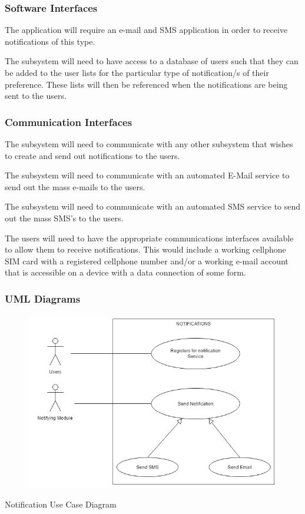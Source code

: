 \documentclass{article}
\begin{document}
	\subsubsection{Software Interfaces}
	\begin{flushleft}
	The application will require an e-mail and SMS application in order to receive notifications of this type.
	
	The subsystem will need to have access to a database of users such that they can be added to the user lists for the particular type of notification/s of their preference. These lists will then be referenced when the notifications are being sent to the users.
\end{flushleft}	    

	\subsubsection{Communication Interfaces}
	\begin{flushleft}
	The subsystem will need to communicate with any other subsystem that wishes to create and send out notifications to the users.
	
	The subsystem will need to communicate with an automated E-Mail service to send out the mass e-mails to the users.
	
	The subsystem will need to communicate with an automated SMS service to send out the mass SMS's to the users.
	
	The users will need to have the appropriate communications interfaces available to allow them to receive notifications. This would include a working cellphone SIM card with a registered cellphone number and/or a working e-mail account that is accessible on a device with a data connection of some form.
	\end{flushleft}
    
    
    
    \clearpage
    \subsubsection{UML Diagrams}
    
    \begin{figure}[h!]
        \includegraphics[width=\textwidth]{Notifications_Use_Case.png}
    \end{figure}
    Notification Use Case Diagram
    
\end{document}

